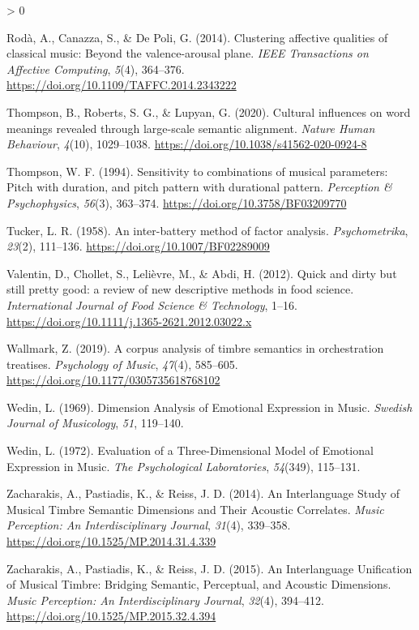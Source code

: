 \documentclass[
  english,
  man,floatsintext]{apa6}
\newlength{\cslhangindent}
\newenvironment{CSLReferences}[2] %
 {%
  \setlength{\parindent}{0pt}
  \ifodd #1 \everypar{\setlength{\hangindent}{\cslhangindent}}\ignorespaces\fi
  \ifnum #2 > 0
  \setlength{\parskip}{#2\baselineskip}
  \fi
 }%
 {}
\begin{document}
\begin{CSLReferences}{1}{0}
\leavevmode\hypertarget{ref-Roda2014}{}%
Rodà, A., Canazza, S., \& De Poli, G. (2014). {Clustering affective qualities of classical music: Beyond the valence-arousal plane}. \emph{IEEE Transactions on Affective Computing}, \emph{5}(4), 364--376. \url{https://doi.org/10.1109/TAFFC.2014.2343222}

\leavevmode\hypertarget{ref-Thompson2020}{}%
Thompson, B., Roberts, S. G., \& Lupyan, G. (2020). {Cultural influences on word meanings revealed through large-scale semantic alignment}. \emph{Nature Human Behaviour}, \emph{4}(10), 1029--1038. \url{https://doi.org/10.1038/s41562-020-0924-8}

\leavevmode\hypertarget{ref-Thompson1994}{}%
Thompson, W. F. (1994). {Sensitivity to combinations of musical parameters: Pitch with duration, and pitch pattern with durational pattern}. \emph{Perception {\&} Psychophysics}, \emph{56}(3), 363--374. \url{https://doi.org/10.3758/BF03209770}

\leavevmode\hypertarget{ref-Tucker1958}{}%
Tucker, L. R. (1958). {An inter-battery method of factor analysis}. \emph{Psychometrika}, \emph{23}(2), 111--136. \url{https://doi.org/10.1007/BF02289009}

\leavevmode\hypertarget{ref-Valentin2012}{}%
Valentin, D., Chollet, S., Lelièvre, M., \& Abdi, H. (2012). {Quick and dirty but still pretty good: a review of new descriptive methods in food science}. \emph{International Journal of Food Science {\&} Technology}, 1--16. \url{https://doi.org/10.1111/j.1365-2621.2012.03022.x}

\leavevmode\hypertarget{ref-Wallmark2019}{}%
Wallmark, Z. (2019). {A corpus analysis of timbre semantics in orchestration treatises}. \emph{Psychology of Music}, \emph{47}(4), 585--605. \url{https://doi.org/10.1177/0305735618768102}

\leavevmode\hypertarget{ref-Wedin1969}{}%
Wedin, L. (1969). {Dimension Analysis of Emotional Expression in Music}. \emph{Swedish Journal of Musicology}, \emph{51}, 119--140.

\leavevmode\hypertarget{ref-Wedin1972}{}%
Wedin, L. (1972). {Evaluation of a Three-Dimensional Model of Emotional Expression in Music}. \emph{The Psychological Laboratories}, \emph{54}(349), 115--131.

\leavevmode\hypertarget{ref-Zacharakis2014}{}%
Zacharakis, A., Pastiadis, K., \& Reiss, J. D. (2014). {An Interlanguage Study of Musical Timbre Semantic Dimensions and Their Acoustic Correlates}. \emph{Music Perception: An Interdisciplinary Journal}, \emph{31}(4), 339--358. \url{https://doi.org/10.1525/MP.2014.31.4.339}

\leavevmode\hypertarget{ref-Zacharakis2015}{}%
Zacharakis, A., Pastiadis, K., \& Reiss, J. D. (2015). {An Interlanguage Unification of Musical Timbre: Bridging Semantic, Perceptual, and Acoustic Dimensions}. \emph{Music Perception: An Interdisciplinary Journal}, \emph{32}(4), 394--412. \url{https://doi.org/10.1525/MP.2015.32.4.394}

\end{CSLReferences}

\endgroup
\end{document}
